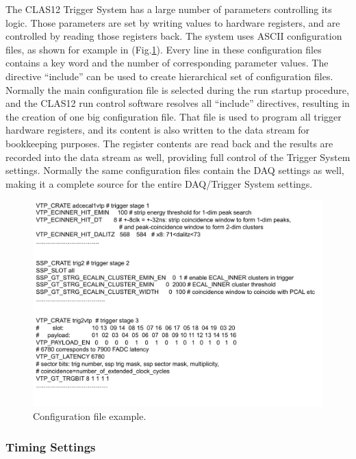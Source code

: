 The CLAS12 Trigger System has a large number of parameters controlling its logic. Those parameters are set by writing values to hardware registers, and are controlled by reading those registers back. The system uses ASCII configuration files, as shown for example in (Fig.\ref{fig:config}). Every line in these configuration files contains a key word and the number of corresponding parameter values. The directive ``include'' can be used to create hierarchical set of configuration files. Normally the main configuration file is selected during the run startup procedure, and the CLAS12 run control software resolves all ``include'' directives, resulting in the creation of one big configuration file. That file is used to program all trigger hardware registers, and its content is also written to the data stream for bookkeeping purposes. The register contents are read back and the results are recorded into the data stream as well, providing full control of the Trigger System settings. Normally the same configuration files contain the DAQ settings as well, making it a complete source for the entire DAQ/Trigger System settings.

\begin{figure}[hbt]
	\centering
	\includegraphics[width=1.0\columnwidth,keepaspectratio]{img/config.png}
	\caption{Configuration file example.}
	\label{fig:config}
\end{figure}


\subsubsection{Timing Settings}

